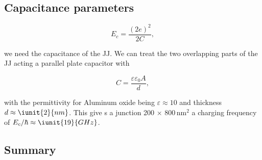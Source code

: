 

 \subsection{Capacitance parameters}
 \label{sec:capac-param}

\begin{equation}\label{eqn:sim_1}
  E_c = \frac{(2e)^2}{2C},
\end{equation}

\noindent  we need  the capacitance  of the  JJ. We  can treat  the two
overlapping parts of the JJ acting a parallel plate capacitor with

\begin{framed}\noindent
  \begin{equation}\label{key}
    C = \frac{\varepsilon\varepsilon_0A}{d},
  \end{equation}

  \noindent   with   the   permittivity  for   Aluminum   oxide   being
  $ \varepsilon \approx 10 $ and thickness $ d \approx \iunit{2}{nm} $.
  This  give s  a  junction 200  $ \times  $  800\,nm$^{2}$ a  charging
  frequency of $ E_c/\hbar \approx\iunit{19}{GHz} $.
\end{framed}

\newpage\subsection{Summary}
\label{sec:summary}

